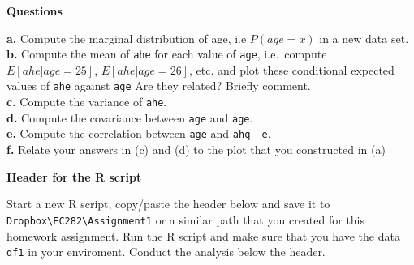 \documentclass[
]{book}
\begin{document}
\textbf{Questions}

\textbf{a.} Compute the marginal distribution of age, i.e \(P(age=x)\) in a new data set.
\textbf{b.} Compute the mean of \texttt{ahe} for each value of \texttt{age}, i.e.~compute \(E[ahe|age=25]\),
\(E[ahe|age=26]\), etc. and plot these conditional expected values of \texttt{ahe} against \texttt{age} Are they related? Briefly comment.\\
\textbf{c.} Compute the variance of \texttt{ahe}.\\
\textbf{d.} Compute the covariance between \texttt{age} and \texttt{age}.\\
\textbf{e.} Compute the correlation between \texttt{age} and \texttt{ahq\ \ e}.\\
\textbf{f.} Relate your answers in (c) and (d) to the plot that you constructed in (a)

\textbf{Header for the R script}

Start a new R script, copy/paste the header below and save it to \texttt{Dropbox\textbackslash{}EC282\textbackslash{}Assignment1} or a similar path that you created for this homework assignment. Run the R script and make sure that you have the data \texttt{df1} in your enviroment. Conduct the analysis below the header.
\end{document}
